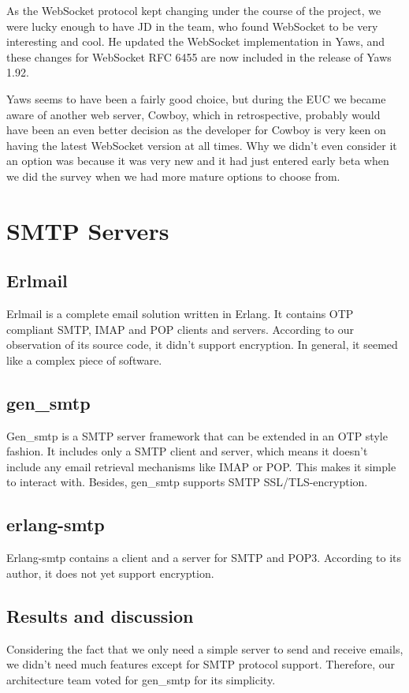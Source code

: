 \documentclass[11pt,a4paper]{report}
\begin{document}
As the WebSocket protocol kept changing under the course of the project, we were
lucky enough to have JD in the team, who found WebSocket to be very interesting
and cool. He updated the WebSocket implementation in Yaws, and these changes for
WebSocket RFC 6455 are now included in the release of Yaws 1.92.

Yaws seems to have been a fairly good choice, but during the EUC we became aware
of another web server, Cowboy\cite{cowboy_pres}, which in retrospective,
probably would have been an even better decision as the developer for Cowboy is
very keen on having the latest WebSocket version at all times. Why we didn't
even consider it an option was because it was very new and it had just entered
early beta when we did the survey when we had more mature options to choose
from.

\section{SMTP Servers}
\subsection{Erlmail}
Erlmail is a complete email solution written in Erlang. It contains OTP
compliant SMTP, IMAP and POP clients and servers. According to our observation
of its source code, it didn't support encryption. In general, it seemed like a
complex piece of software.

\subsection{gen\_smtp}
Gen\_smtp is a SMTP server framework that can be extended in an OTP style
fashion. It includes only a SMTP client and server, which means it doesn't
include any email retrieval mechanisms like IMAP or POP. This makes it simple to
interact with. Besides, gen\_smtp supports SMTP SSL/TLS-encryption.

\subsection{erlang-smtp}
Erlang-smtp contains a client and a server for SMTP and POP3.
According to its author, it does not yet support encryption.

\subsection{Results and discussion}
Considering the fact that we only need a simple server to send and receive
emails, we didn't need much features except for SMTP protocol
support. Therefore, our architecture team voted for gen\_smtp for its
simplicity.
\end{document}
